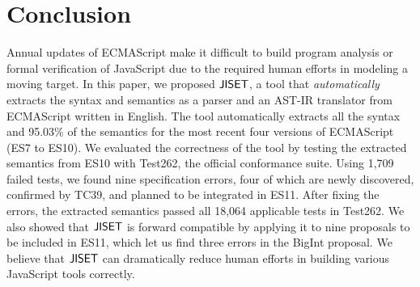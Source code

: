 \section{Conclusion}\label{sec:conclude}
Annual updates of ECMAScript make it difficult to build program
analysis or formal verification of JavaScript due to the required human efforts
in modeling a moving target.  In this paper, we proposed \( \text{\sf JISET} \), a tool
that \textit{automatically} extracts the syntax and semantics as a parser and
an AST-IR translator from ECMAScript written in English.
The tool automatically extracts all the syntax and 95.03\% of the
semantics for the most recent four versions of ECMAScript (ES7 to ES10).
We evaluated the correctness of the tool by testing the extracted
semantics from ES10 with Test262, the official conformance suite.
Using 1,709 failed tests, we found nine specification errors,
four of which are newly discovered, confirmed by TC39, and planned to
be integrated in ES11.  After fixing the errors, the extracted
semantics passed all 18,064 applicable tests in Test262.
We also showed that \( \text{\sf JISET} \) is forward compatible by applying it to nine
proposals to be included in ES11, which let us find three errors in the
BigInt proposal.  We believe that \( \text{\sf JISET} \) can dramatically reduce
human efforts in building various JavaScript tools correctly.

